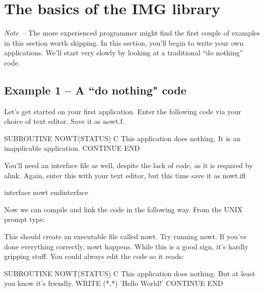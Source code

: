 \documentclass[11pt,nolof]{starlink}
\begin{document}
\section{The basics of the IMG library}

      \emph{Note}\, -- The more experienced programmer might find the first
      couple of examples in this section worth skipping.
      In this section, you'll begin to write your own applications. We'll
      start very slowly by looking at a traditional ``do nothing'' code.

\subsection{Example 1 -- A ``do nothing" code}

      Let's get started on your first application. Enter the following
      code via your choice of text editor. Save it as \textsf{nowt.f}.

\begin{small}
\begin{terminalv}
      SUBROUTINE NOWT(STATUS)
C This application does nothing. It is an inapplicable application.
      CONTINUE
      END
\end{terminalv}
\end{small}

      You'll need an interface file as well,
      despite the lack of code, as it is required by \textsf{alink}.
      Again, enter this with your text editor, but this time save it as \textsf{nowt.ifl}

\begin{small}
\begin{terminalv}
interface nowt
endinterface
\end{terminalv}
\end{small}

      Now we can compile and link the code in the following way. From the
      UNIX prompt type:

\begin{terminalv}
\end{terminalv}

      This should create an executable file called \textsf{nowt}. Try running
      \textsf{nowt}. If you've done everything correctly, nowt happens. While
      this is a good sign, it's hardly gripping stuff. You could
      always edit the code so it reads:

\begin{small}
\begin{terminalv}
      SUBROUTINE NOWT(STATUS)
C This application does nothing. But at least you know it's friendly.
      WRITE (*,*) 'Hello World!'
      CONTINUE
      END
\end{terminalv}
\end{small}
\end{document}
